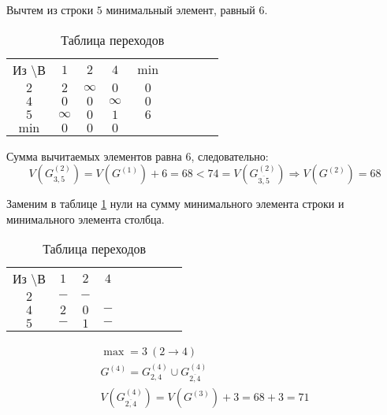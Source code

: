 Вычтем из строки $5$ минимальный элемент, равный $6$.

\begin{table}[H]
\begin{center}
	\def\tabcolsep{15pt}
	\caption{Таблица переходов}
	\label{tab:16}
	\begin{tabular}{|c||c|c|c|c|c|c|c|c|}
		\hline
		Из \textbackslash В & $1$ & $2$ & $4$ & $\min$ \\
		\hhline{|=#=|=|=|=|=|=|}
		$2$ & $2$ & $\infty$ & $0$ & $0$ \\
		\hline
		$4$ & $0$ & $0$ & $\infty$ & $0$ \\
		\hline
		$5$ & $\infty$ & $0$ & $1$ & $6$ \\
		\hhline{|=#=|=|=|=|=|=|} 
		$\min$ & $0$ & $0$ & $0$ & \\ 
		\hline
	\end{tabular}
\end{center}
\end{table}

Сумма вычитаемых элементов равна $6$, следовательно:
\begin{equation*}
V(G_{3,5}^{(2)}) = V(G^{(1)}) + 6 = 68 < 74 = V(G_{\overline{3,5}}^{(2)}) \Rightarrow V(G^{(2)}) = 68
\end{equation*}

Заменим в таблице \ref{tab:16} нули на сумму минимального элемента строки и минимального элемента столбца.

\begin{table}[H]
\begin{center}
	\def\tabcolsep{15pt}
	\caption{Таблица переходов}
	\label{tab:17}
	\begin{tabular}{|c||c|c|c|c|c|c|c|c|}
		\hline
		Из \textbackslash В & $1$ & $2$ & $4$ \\
		\hhline{|=#=|=|=|=|=|=|}
		$2$ & $-$ & $-$ & \redbold{$3$} \\
		\hline
		$4$ & $2$ & $0$ & $-$ \\
		\hline
		$5$ & $-$ & $1$ & $-$ \\
		\hline
	\end{tabular}
\end{center}
\end{table}

\begin{gather*}
\max = 3\ (2 \rightarrow 4) \\
G^{(4)} = G_{2,4}^{(4)} \cup G_{\overline{2,4}}^{(4)} \\
V(G_{\overline{2,4}}^{(4)}) = V(G^{(3)}) + 3 = 68 + 3 = 71
\end{gather*}

